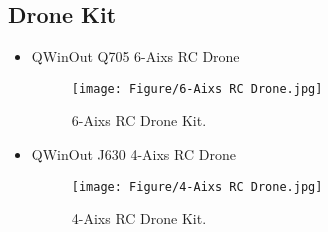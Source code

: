 \subsection{Drone Kit}
\begin{itemize}
    \item QWinOut Q705 6-Aixs RC Drone\par
    \begin{figure}[H]
        \centerline{\texttt{[image: Figure/6-Aixs RC Drone.jpg]}}
        \caption{6-Aixs RC Drone Kit.}
        \label{fig4}
    \end{figure}
    
    \item QWinOut J630 4-Aixs RC Drone\par
    \begin{figure}[H]
        \centerline{\texttt{[image: Figure/4-Aixs RC Drone.jpg]}}
        \caption{4-Aixs RC Drone Kit.}
        \label{fig4}
    \end{figure}
\end{itemize}